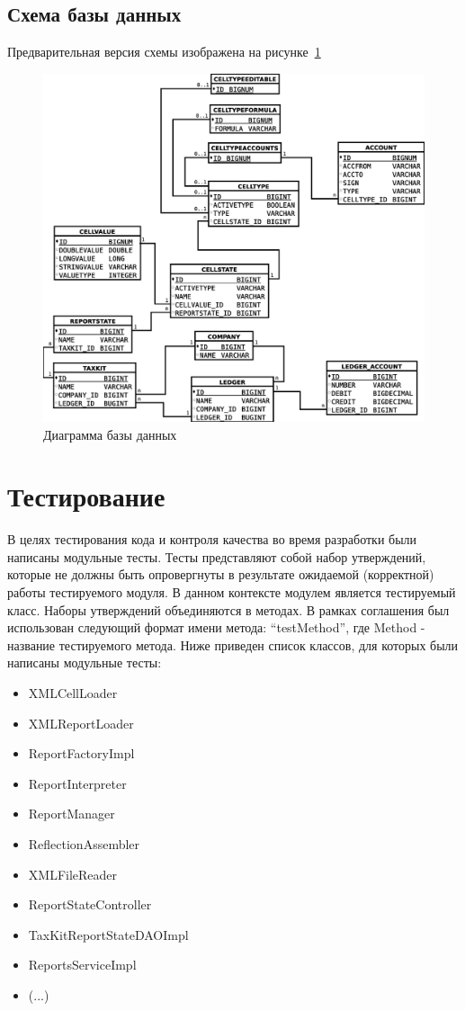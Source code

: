 \documentclass[14pt,a4paper]{reportmod}
\begin{document}
\subsection{Схема базы данных}
Предварительная версия схемы изображена на рисунке~\ref{pic:database}
\begin{figure}
  \centering
  \includegraphics[scale=0.4]{uml/database}
  \caption{Диаграмма базы данных}
  \label{pic:database}
\end{figure}

\section{Тестирование}
В целях тестирования кода и контроля качества во время разработки были написаны модульные тесты. Тесты представляют собой набор утверждений, которые не должны быть опровергнуты в результате ожидаемой (корректной) работы тестируемого модуля. В данном контексте модулем является тестируемый класс. Наборы утверждений объединяются в методах. В рамках соглашения был использован следующий формат имени метода: ``testMethod'', где Method - название тестируемого метода.
Ниже приведен список классов, для которых были написаны модульные тесты:
\begin{itemize}
  \item XMLCellLoader
  \item XMLReportLoader
  \item ReportFactoryImpl
  \item ReportInterpreter
  \item ReportManager
  \item ReflectionAssembler
  \item XMLFileReader
  \item ReportStateController
  \item TaxKitReportStateDAOImpl
  \item ReportsServiceImpl
  \item (...)
\end{itemize}
\end{document}

